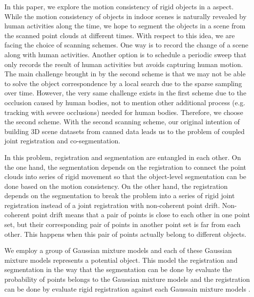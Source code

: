 In this paper, we explore the motion consistency of rigid objects in a  aspect.
%
While the motion consistency of objects in indoor scenes is naturally revealed by human activities along the time, we hope to segment the objects in a scene from the scanned point clouds at different times. 
%
With respect to this idea, we are facing the choice of scanning schemes. 
%
One way is to record the change of a scene along with human activities.
Another option is to schedule a periodic sweep that only records the result of human activities but avoids capturing human motion. 
%
The main challenge brought in by the second scheme is that we may not be able to solve the object correspondence by a local search due to the sparse sampling over time.
However, the very same challenge exists in the first scheme due to the occlusion caused by human bodies, not to mention other additional process (e.g. tracking with severe occlusions) needed for human bodies.
%
Therefore, we choose the second scheme. 
 
%
With the second scanning scheme, our original intention of building 3D scene datasets from canned data leads us to the problem of coupled joint registration and co-segmentation.


In this problem, registration and segmentation are entangled in each other. 
%
On the one hand, the segmentation depends on the registration to connect the point clouds into series of rigid movement so that the object-level segmentation can be done based on the motion consistency. On the other hand, the registration depends on the segmentation to break the problem into a series of rigid joint registration instead of a joint registration with non-coherent point drift.
Non-coherent point drift means that a pair of points is close to each other in one point set, but their corresponding pair of points in another point set is far from each other. 
%
This happens when this pair of points actually belong to different objects.

We employ a group of Gaussian mixture models and each of these Gaussian mixture models represents a potential object. 
This model  the registration and segmentation in the way that the segmentation can be done by evaluate  the probability of points belongs to the Gaussian mixture models and the registration can be done by evaluate  rigid registration against each Gaussain mixture models .


